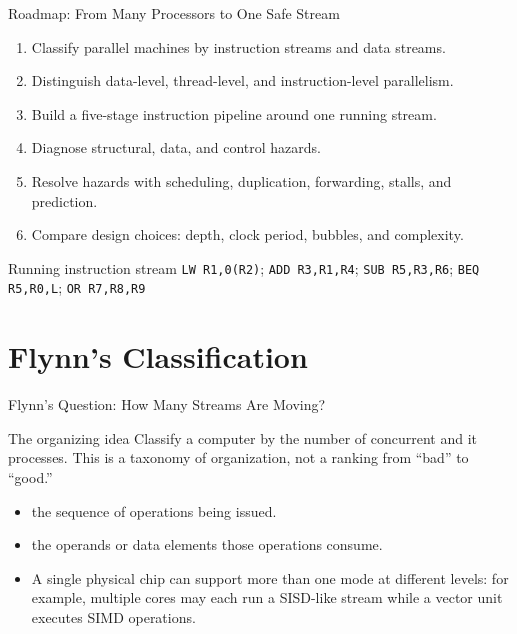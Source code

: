 \documentclass[aspectratio=169]{beamer}
\begin{document}
\begin{frame}{Roadmap: From Many Processors to One Safe Stream}
  \begin{enumerate}
    \item Classify parallel machines by instruction streams and data streams.
    \item Distinguish data-level, thread-level, and instruction-level
      parallelism.
    \item Build a five-stage instruction pipeline around one running stream.
    \item Diagnose structural, data, and control hazards.
    \item Resolve hazards with scheduling, duplication, forwarding, stalls,
      and prediction.
    \item Compare design choices: depth, clock period, bubbles, and complexity.
  \end{enumerate}
  \vspace{0.15cm}
  \begin{alertblock}{Running instruction stream}
    \texttt{LW R1,0(R2)}; \texttt{ADD R3,R1,R4}; \texttt{SUB R5,R3,R6};
    \texttt{BEQ R5,R0,L}; \texttt{OR R7,R8,R9}
  \end{alertblock}
\end{frame}


\section{Flynn's Classification}

\begin{frame}{Flynn's Question: How Many Streams Are Moving?}
  \begin{block}{The organizing idea}
    Classify a computer by the number of concurrent 
    and  it processes. This is a taxonomy of organization,
    not a ranking from ``bad'' to ``good.''
  \end{block}
  \begin{itemize}
    \item {} the sequence of operations being issued.
    \item {} the operands or data elements those operations
      consume.
    \item A single physical chip can support more than one mode at different
      levels: for example, multiple cores may each run a SISD-like stream while
      a vector unit executes SIMD operations.
  \end{itemize}
\end{frame}
\end{document}
